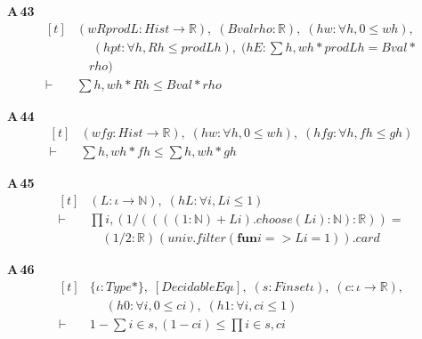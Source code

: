 \noindent\textbf{A\,43}\quad{}
{\footnotesize\[ \begin{aligned}[t]
&(\mathit{w} \mathit{R} \mathit{prodL} : \mathit{Hist} \to \mathbb{R} ),\; (\mathit{Bval} \mathit{rho} : \mathbb{R} ),\; (\mathit{hw} : \forall \mathit{h}, 0 \leq \mathit{w} \mathit{h}),\\
&\quad \; (\mathit{hpt} : \forall \mathit{h}, \mathit{R} \mathit{h} \leq \mathit{prodL} \mathit{h}),\; (\mathit{hE} : \textstyle\sum \mathit{h}, \mathit{w} \mathit{h} * \mathit{prodL} \mathit{h} = \mathit{Bval} *\\
&\quad \mathit{rho})\\
\vdash\;&\textstyle\sum \mathit{h}, \mathit{w} \mathit{h} * \mathit{R} \mathit{h} \leq \mathit{Bval} * \mathit{rho}
\end{aligned} \]}

\noindent\textbf{A\,44}\quad{}
{\footnotesize\[ \begin{aligned}[t]
&(\mathit{w} \mathit{f} \mathit{g} : \mathit{Hist} \to \mathbb{R} ),\; (\mathit{hw} : \forall \mathit{h}, 0 \leq \mathit{w} \mathit{h}),\; (\mathit{hfg} : \forall \mathit{h}, \mathit{f} \mathit{h} \leq \mathit{g} \mathit{h})\\
\vdash\;&\textstyle\sum \mathit{h}, \mathit{w} \mathit{h} * \mathit{f} \mathit{h} \leq \textstyle\sum \mathit{h}, \mathit{w} \mathit{h} * \mathit{g} \mathit{h}
\end{aligned} \]}

\noindent\textbf{A\,45}\quad{}
{\footnotesize\[ \begin{aligned}[t]
&(\mathit{L} : \iota \to \mathbb{N} ),\; (\mathit{hL} : \forall \mathit{i}, \mathit{L} \mathit{i} \leq 1)\\
\vdash\;&\textstyle\prod \mathit{i}, (1 / ((((1:\mathbb{N} ) + \mathit{L} \mathit{i}).\mathit{choose} (\mathit{L} \mathit{i}) : \mathbb{N} ) : \mathbb{R} )) =\\
&\quad (1 / 2 : \mathbb{R} ) ^{} (\mathit{univ}.\mathit{filter} (\mathbf{fun} \mathit{i} => \mathit{L} \mathit{i} = 1)).\mathit{card}
\end{aligned} \]}

\noindent\textbf{A\,46}\quad{}
{\footnotesize\[ \begin{aligned}[t]
&\{ \iota : \mathit{Type}*\},\; [\mathit{DecidableEq} \iota ],\; (\mathit{s} : \mathit{Finset} \iota ),\; (\mathit{c} : \iota \to \mathbb{R} ),\\
&\quad \; (\mathit{h0} : \forall \mathit{i}, 0 \leq \mathit{c} \mathit{i}),\; (\mathit{h1} : \forall \mathit{i}, \mathit{c} \mathit{i} \leq 1)\\
\vdash\;&1 - \textstyle\sum \mathit{i} \in \mathit{s}, (1 - \mathit{c} \mathit{i}) \leq \textstyle\prod \mathit{i} \in \mathit{s}, \mathit{c} \mathit{i}
\end{aligned} \]}

